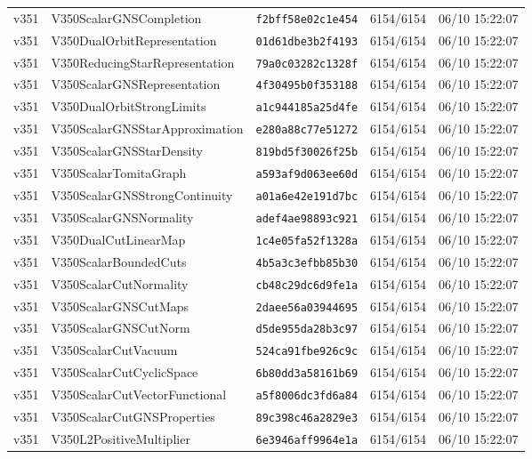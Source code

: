 \documentclass[11pt]{article}
\theoremstyle{definition}\newtheorem{deriv}{Derivação}
\begin{document}
{\begin{longtable}{@{}lllll@{}}
v351 & V350ScalarGNSCompletion & \texttt{f2bff58e02c1e454} & 6154/6154 & 06/10 15:22:07 \\
v351 & V350DualOrbitRepresentation & \texttt{01d61dbe3b2f4193} & 6154/6154 & 06/10 15:22:07 \\
v351 & V350ReducingStarRepresentation & \texttt{79a0c03282c1328f} & 6154/6154 & 06/10 15:22:07 \\
v351 & V350ScalarGNSRepresentation & \texttt{4f30495b0f353188} & 6154/6154 & 06/10 15:22:07 \\
v351 & V350DualOrbitStrongLimits & \texttt{a1c944185a25d4fe} & 6154/6154 & 06/10 15:22:07 \\
v351 & V350ScalarGNSStarApproximation & \texttt{e280a88c77e51272} & 6154/6154 & 06/10 15:22:07 \\
v351 & V350ScalarGNSStarDensity & \texttt{819bd5f30026f25b} & 6154/6154 & 06/10 15:22:07 \\
v351 & V350ScalarTomitaGraph & \texttt{a593af9d063ee60d} & 6154/6154 & 06/10 15:22:07 \\
v351 & V350ScalarGNSStrongContinuity & \texttt{a01a6e42e191d7bc} & 6154/6154 & 06/10 15:22:07 \\
v351 & V350ScalarGNSNormality & \texttt{adef4ae98893c921} & 6154/6154 & 06/10 15:22:07 \\
v351 & V350DualCutLinearMap & \texttt{1c4e05fa52f1328a} & 6154/6154 & 06/10 15:22:07 \\
v351 & V350ScalarBoundedCuts & \texttt{4b5a3c3efbb85b30} & 6154/6154 & 06/10 15:22:07 \\
v351 & V350ScalarCutNormality & \texttt{cb48c29dc6d9fe1a} & 6154/6154 & 06/10 15:22:07 \\
v351 & V350ScalarGNSCutMaps & \texttt{2daee56a03944695} & 6154/6154 & 06/10 15:22:07 \\
v351 & V350ScalarGNSCutNorm & \texttt{d5de955da28b3c97} & 6154/6154 & 06/10 15:22:07 \\
v351 & V350ScalarCutVacuum & \texttt{524ca91fbe926c9c} & 6154/6154 & 06/10 15:22:07 \\
v351 & V350ScalarCutCyclicSpace & \texttt{6b80dd3a58161b69} & 6154/6154 & 06/10 15:22:07 \\
v351 & V350ScalarCutVectorFunctional & \texttt{a5f8006dc3fd6a84} & 6154/6154 & 06/10 15:22:07 \\
v351 & V350ScalarCutGNSProperties & \texttt{89c398c46a2829e3} & 6154/6154 & 06/10 15:22:07 \\
v351 & V350L2PositiveMultiplier & \texttt{6e3946aff9964e1a} & 6154/6154 & 06/10 15:22:07 \\

\end{longtable}}
\end{document}
